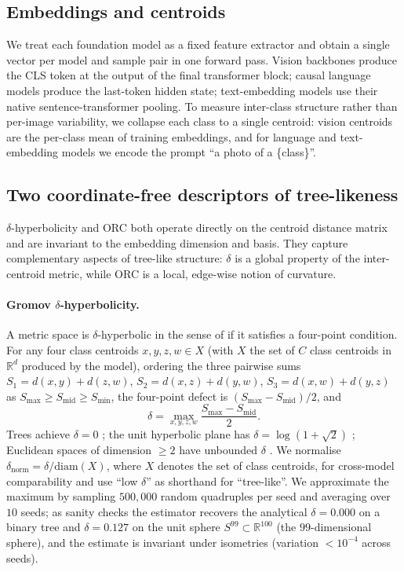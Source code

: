 \documentclass{article}
\begin{document}
\subsection{Embeddings and centroids}
\label{sec:embeddings}

We treat each foundation model as a fixed feature extractor and obtain a single vector per model and sample pair in one forward pass. Vision backbones produce the CLS token at the output of the final transformer block; causal language models produce the last-token hidden state; text-embedding models use their native sentence-transformer pooling. To measure inter-class structure rather than per-image variability, we collapse each class to a single centroid: vision centroids are the per-class mean of training embeddings, and for language and text-embedding models we encode the prompt ``a photo of a \{class\}''.

\subsection{Two coordinate-free descriptors of tree-likeness}
\label{sec:descriptors}

$\delta$-hyperbolicity and ORC both operate directly on the centroid distance matrix and are invariant to the embedding dimension and basis. They capture complementary aspects of tree-like structure: $\delta$ is a global property of the inter-centroid metric, while ORC is a local, edge-wise notion of curvature.

\paragraph{Gromov $\delta$-hyperbolicity.} A metric space is $\delta$-hyperbolic in the sense of \citet{Gromov1987} if it satisfies a four-point condition. For any four class centroids $x, y, z, w \in X$ (with $X$ the set of $C$ class centroids in $\mathbb{R}^d$ produced by the model), ordering the three pairwise sums $S_1{=}d(x,y){+}d(z,w)$, $S_2{=}d(x,z){+}d(y,w)$, $S_3{=}d(x,w){+}d(y,z)$ as $S_{\max} \ge S_{\text{mid}} \ge S_{\min}$, the four-point defect is $(S_{\max}-S_{\text{mid}})/2$, and
\begin{equation}
\delta = \max_{x,y,z,w} \frac{S_{\max} - S_{\text{mid}}}{2}.
\end{equation}
Trees achieve $\delta = 0$ \citep{Gromov1987}; the unit hyperbolic plane has $\delta = \log(1{+}\sqrt{2})$ \citep{Gromov1987}; Euclidean spaces of dimension $\geq 2$ have unbounded $\delta$ \citep{Gromov1987}. We normalise $\delta_{\text{norm}} = \delta / \mathrm{diam}(X)$, where $X$ denotes the set of class centroids, for cross-model comparability and use ``low $\delta$'' as shorthand for ``tree-like''. We approximate the maximum by sampling $500{,}000$ random quadruples per seed and averaging over $10$ seeds; as sanity checks the estimator recovers the analytical $\delta = 0.000$ on a binary tree and $\delta = 0.127$ on the unit sphere $S^{99} \subset \mathbb{R}^{100}$ (the $99$-dimensional sphere), and the estimate is invariant under isometries (variation $<10^{-4}$ across seeds).
\end{document}
